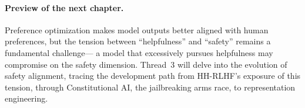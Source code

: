 \paragraph{Preview of the next chapter.}
Preference optimization makes model outputs better aligned with human preferences,
but the tension between ``helpfulness'' and ``safety'' remains a fundamental challenge---
a model that excessively pursues helpfulness may compromise on the safety dimension.
Thread~3 will delve into the evolution of safety alignment,
tracing the development path from HH-RLHF's exposure of this tension,
through Constitutional AI, the jailbreaking arms race, to representation engineering.
